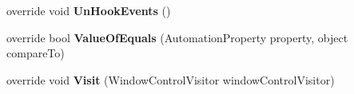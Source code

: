 \begin{DoxyCompactItemize}
\item 
\hypertarget{class_proto_test_1_1_golem_1_1_white_1_1_elements_1_1_white_label_a6d7f681a7d72ce78c1a2f55b6af6323e}{override void {\bfseries Un\-Hook\-Events} ()}\label{class_proto_test_1_1_golem_1_1_white_1_1_elements_1_1_white_label_a6d7f681a7d72ce78c1a2f55b6af6323e}

\item 
\hypertarget{class_proto_test_1_1_golem_1_1_white_1_1_elements_1_1_white_label_aecb7da0faffcd9cb5a62a446cc672ecd}{override bool {\bfseries Value\-Of\-Equals} (Automation\-Property property, object compare\-To)}\label{class_proto_test_1_1_golem_1_1_white_1_1_elements_1_1_white_label_aecb7da0faffcd9cb5a62a446cc672ecd}

\item 
\hypertarget{class_proto_test_1_1_golem_1_1_white_1_1_elements_1_1_white_label_ab5831b802298dd3aa23709efc2a736ea}{override void {\bfseries Visit} (Window\-Control\-Visitor window\-Control\-Visitor)}\label{class_proto_test_1_1_golem_1_1_white_1_1_elements_1_1_white_label_ab5831b802298dd3aa23709efc2a736ea}

\end{DoxyCompactItemize}
